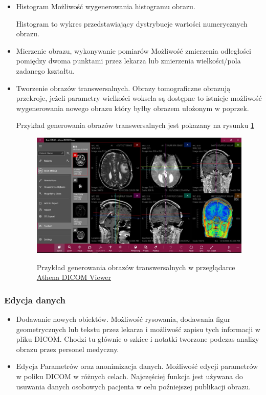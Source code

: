 \begin{itemize}
      \item Histogram
            Możliwość wygenerowania histogramu obrazu.

            Histogram to wykres przedstawiający dystrybucje wartości numerycznych obrazu.

      \item Mierzenie obrazu, wykonywanie pomiarów
            Możliwość zmierzenia odległości pomiędzy dwoma punktami przez lekarza lub zmierzenia wielkości/pola zadanego kształtu.

      \item Tworzenie obrazów transwersalnych.
            Obrazy tomograficzne obrazują przekroje, jeżeli parametry wielkości woksela są dostępne to istnieje możliwość wygenerowania nowego obrazu który byłby obrazem ułożonym w poprzek.

            Przykład generowania obrazów transwersalnych jest pokazany na rysunku \ref{fig:dicomviewer003}

            \begin{figure}[!htbp]
                  \caption{Przykład generowania obrazów transwersalnych w przeglądarce \href{https://athenadicomviewer.com/}{Athena DICOM Viewer}}
                  \includegraphics[width=\textwidth]{img/dicom-viewer-003.jpeg}
                  \centering
                  \label{fig:dicomviewer003}
            \end{figure}
\end{itemize}

\subsubsection{Edycja danych}

\begin{itemize}
      \item Dodawanie nowych obiektów.
            Możliwość rysowania, dodawania figur geometrycznych lub tekstu przez lekarza i możliwość zapisu tych informacji w pliku DICOM.
            Chodzi tu głównie o szkice i notatki tworzone podczas analizy obrazu przez personel medyczny.

      \item Edycja Parametrów oraz anonimizacja danych.
            Możliwość edycji parametrów w poliku DICOM w różnych celach.
            Najczęściej funkcja jest używana do usuwania danych osobowych pacjenta w celu poźniejszej publikacji obrazu.

\end{itemize}